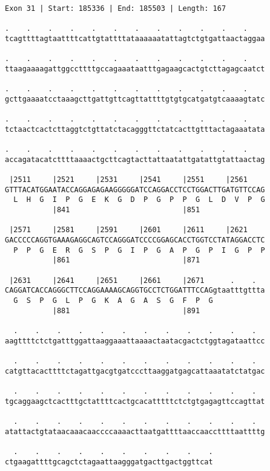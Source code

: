 \documentclass{article}
\begin{document}
\begin{Verbatim}
Exon 31 | Start: 185336 | End: 185503 | Length: 167
 
.    .    .    .    .    .    .    .    .    .    .    .    
tcagttttagtaattttcattgtattttataaaaaatattagtctgtgattaactaggaa
  
.    .    .    .    .    .    .    .    .    .    .    .    
ttaagaaaagattggccttttgccagaaataatttgagaagcactgtcttagagcaatct
  
.    .    .    .    .    .    .    .    .    .    .    .    
gcttgaaaatcctaaagcttgattgttcagttattttgtgtgcatgatgtcaaaagtatc
  
.    .    .    .    .    .    .    .    .    .    .    .    
tctaactcactcttaggtctgttatctacagggttctatcacttgtttactagaaatata
  
.    .    .    .    .    .    .    .    .    .    .    .    
accagatacatcttttaaaactgcttcagtacttattaatattgatattgtattaactag
  
 |2511     |2521     |2531     |2541     |2551     |2561    
GTTTACATGGAATACCAGGAGAGAAGGGGGATCCAGGACCTCCTGGACTTGATGTTCCAG
  L  H  G  I  P  G  E  K  G  D  P  G  P  P  G  L  D  V  P  G
           |841                          |851               
  
 |2571     |2581     |2591     |2601     |2611     |2621    
GACCCCCAGGTGAAAGAGGCAGTCCAGGGATCCCCGGAGCACCTGGTCCTATAGGACCTC
  P  P  G  E  R  G  S  P  G  I  P  G  A  P  G  P  I  G  P  P
           |861                          |871               
  
 |2631     |2641     |2651     |2661     |2671      .    .  
CAGGATCACCAGGGCTTCCAGGAAAAGCAGGTGCCTCTGGATTTCCAGgtaatttgttta
  G  S  P  G  L  P  G  K  A  G  A  S  G  F  P  G            
           |881                          |891               
  
  .    .    .    .    .    .    .    .    .    .    .    .  
aagttttctctgatttggattaaggaaattaaaactaatacgactctggtagataattcc
  
  .    .    .    .    .    .    .    .    .    .    .    .  
catgttacacttttctagattgacgtgatcccttaaggatgagcattaaatatctatgac
  
  .    .    .    .    .    .    .    .    .    .    .    .  
tgcaggaagctcactttgctattttcactgcacatttttctctgtgagagttccagttat
  
  .    .    .    .    .    .    .    .    .    .    .    .  
atattactgtataacaaacaaccccaaaacttaatgattttaaccaaccttttaattttg
  
  .    .    .    .    .    .    .    .    .    .
ctgaagattttgcagctctagaattaagggatgacttgactggttcat
\end{Verbatim}
\end{document}

